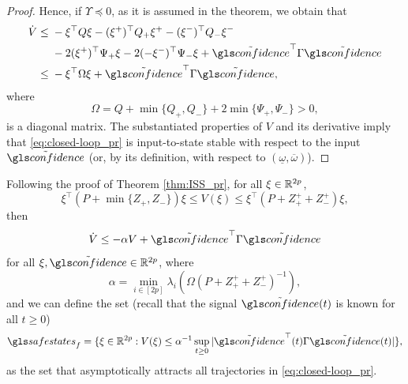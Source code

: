 \begin{proof}
	Hence, if $\Upsilon\preceq0$, as it is assumed in the theorem, we
	obtain that
	\begin{align*}
		\dot{V}  \leq {} & -\xi^{\top}Q\xi-(\xi^{+})^{\top}Q_{+}\xi^{+}-(\xi^{-})^{\top}Q_{-}\xi^{-}\\
		 & -2(\xi^{+})^{\top}\Psi_{+}\xi-2(-\xi^{-})^{\top}\Psi_{-}\xi+\tilde{\confidence}^{\top}\Gamma\tilde{\confidence}\\
		 \leq {} & -\xi^{\top}\Omega\xi+\tilde{\confidence}^{\top}\Gamma\tilde{\confidence},
	\end{align*}
	where
	\[
	\Omega=Q+\min\{Q_{+},Q_{-}\}+2\min\{\Psi_{+},\Psi_{-}\}>0,
	\]
	is a diagonal matrix. The substantiated properties of $V$ and its
	derivative imply that \eqref{eq:closed-loop_pr} is input-to-state
	stable \citep{Sontag:01:Springer,Dashkovskiy:11:AiT} with respect
	to the input $\tilde{\confidence}$ (or, by its definition, with respect
	to $(\underline{\omega},\overline{\omega})$).
\end{proof}
Following the proof of Theorem \ref{thm:ISS_pr}, for all $\xi\in\mathbb{R}^{2p}$,
\[
\xi^{\top}(P+\min\{Z_{+},Z_{-}\})\xi\leq V(\xi)\leq\xi^{\top}(P+Z_{+}^{+}+Z_{-}^{+})\xi,
\]
then
\[
\dot{V}\leq-\alpha V+\tilde{\confidence}^{\top}\Gamma\tilde{\confidence}
\]
for all $\xi,\tilde{\confidence}\in\Real^{2p}$, where
\[
\alpha=\min_{i\in[2p]}\lambda_{i}\left(\Omega(P+Z_{+}^{+}+Z_{-}^{+})^{-1}\right),
\]
and we can define the set (recall that the signal $\tilde{\confidence}(t)$
is known for all $t\geq0$)
\begin{equation}
\safestates_{f}=\{\xi\in\Real^{2p}:V(\xi)\leq\alpha^{-1}\sup_{t\geq0}|\tilde{\confidence}^{\top}(t)\Gamma\tilde{\confidence}(t)|\},\label{eq:X_f}
\end{equation}
as the set that asymptotically attracts all trajectories in \eqref{eq:closed-loop_pr}.

